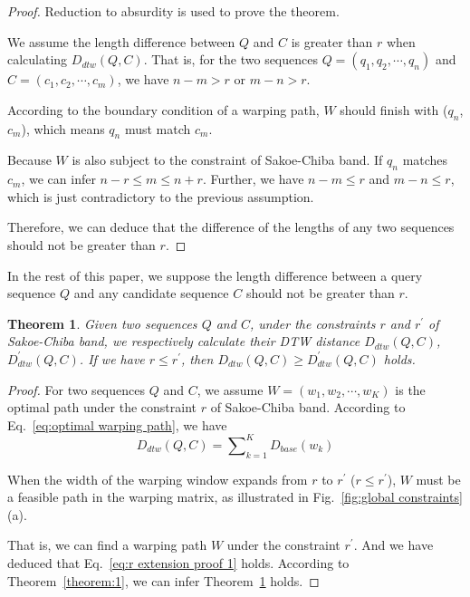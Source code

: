 \documentclass[10pt,journal,compsoc]{IEEEtran}
\newtheorem{theorem}{Theorem}
\begin{document}
\begin{proof}
  Reduction to absurdity is used to prove the theorem.

  We assume the length difference between $Q$ and $C$ is greater than $r$ when calculating $D_{dtw}(Q,C)$.
  That is, for the two sequences $Q=(q_1, q_2, \cdots, q_n)$ and $C=(c_1, c_2, \cdots, c_m)$,
  we have $n-m>r$ or $m-n>r$.

  According to the boundary condition of a warping path,
  $W$ should finish with ($q_n$,$c_m$),
  which means $q_n$ must match $c_m$.

  Because $W$ is also subject to the constraint of Sakoe-Chiba band.
  If $q_n$ matches $c_m$, we can infer $n-r\leq m \leq n+r$.
  Further, we have $n-m \leq r$ and $m-n \leq r$,
  which is just contradictory to the previous assumption.

  Therefore, we can deduce that the difference of the lengths of any two sequences should not be greater than $r$.
  \end{proof}

In the rest of this paper,
we suppose the length difference between a query sequence $Q$ and any candidate sequence $C$ should not be greater than $r$.

\begin{theorem} \label{theorem:3}
  Given two sequences $Q$ and $C$,
  under the constraints $r$ and $r^{'}$ of Sakoe-Chiba band,
  we respectively calculate their DTW distance $D_{dtw}(Q,C)$, $D_{dtw}^{'}(Q,C)$.
  If we have $r \leq r^{'}$,  then $D_{dtw}(Q,C) \geq D_{dtw}^{'}(Q,C)$ holds.
\end{theorem}

  \begin{proof}
  For two sequences $Q$ and $C$,
  we assume $W=(w_1,w_2, \cdots,w_K)$ is the optimal path under the constraint $r$ of Sakoe-Chiba band.
  According to Eq.~\eqref{eq:optimal warping path}, we have
  \begin{equation}\label{eq:r extension proof 1}
     D_{dtw}(Q,C) = \sum\nolimits_{k=1}^K {D_{base}{(w_k)}}
  \end{equation}

  When the width of the warping window expands from $r$ to $r^{'}$ ($r \leq r^{'}$),
  $W$ must be a feasible path in the warping matrix,
  as illustrated in Fig.~\ref{fig:global constraints}(a).

  That is, we can find a warping path $W$ under the constraint $r^{'}$.
  And we have deduced that Eq.~\eqref{eq:r extension proof 1} holds.
  According to Theorem~\ref{theorem:1}, we can infer Theorem~\ref{theorem:3} holds.
  \end{proof}
\end{document}
